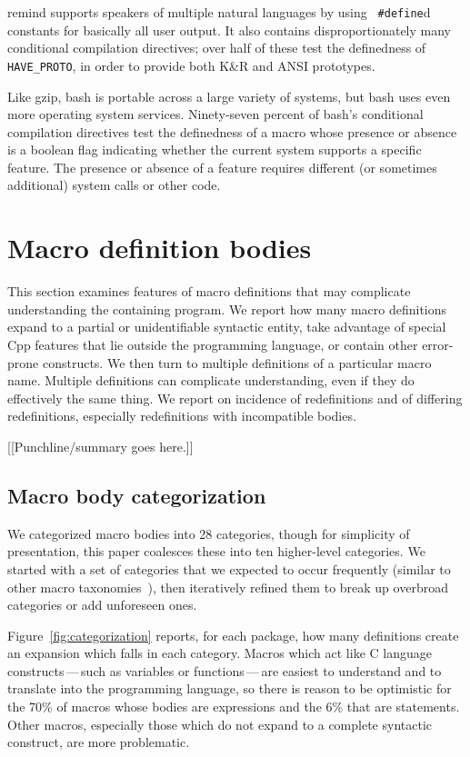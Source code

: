 \documentclass[10pt]{article}
\newcommand{\pkg}[1]{\textsf{#1}}
\begin{document}
\pkg{remind} supports speakers of multiple natural languages by using {\tt
\#define}d constants for basically all user output.  It also contains
disproportionately many conditional compilation directives; over half of
these test the definedness of \verb|HAVE_PROTO|, in order to provide both
K\&R and ANSI prototypes.

Like \pkg{gzip}, \pkg{bash} is portable across a large variety of
systems, but \pkg{bash} uses even more operating system services.
Ninety-seven percent of \pkg{bash}'s conditional compilation directives
test the definedness of a macro whose presence or absence is a boolean
flag indicating whether the current system supports a specific feature.
The presence or absence of a feature requires different (or sometimes
additional) system calls or other code.


\section{Macro definition bodies}
\label{sec:categorization}

This section examines features of macro definitions that may complicate
understanding the containing program.  We report how many macro definitions
expand to a partial or unidentifiable syntactic entity, take advantage of
special Cpp features that lie outside the programming language, or contain
other error-prone constructs.  We then turn to multiple definitions of a
particular macro name.  Multiple definitions can complicate understanding,
even if they do effectively the same thing.  We report on incidence of
redefinitions and of differing redefinitions, especially redefinitions with
incompatible bodies.

[[Punchline/summary goes here.]]



\subsection{Macro body categorization}

We categorized macro bodies into 28 categories, though for simplicity of
presentation, this paper coalesces these into ten higher-level categories.
We started with a set of categories that we expected to occur frequently
(similar to other macro
taxonomies~\cite{Stroustrup-DesignEvolution,Carroll95}), then iteratively
refined them to break up overbroad categories or add unforeseen ones.

Figure~\ref{fig:categorization} reports, for each package, how many
definitions create an expansion which falls in each category.  Macros which
act like C language constructs\,---\,such as variables or
functions\,---\,are easiest to understand and to translate into the
programming language, so there is reason to be optimistic for the 70\% of
macros whose bodies are expressions and the 6\% that are statements.  Other
macros, especially those which do not expand to a complete syntactic
construct, are more problematic.
\end{document}
